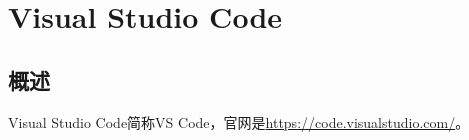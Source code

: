 \documentclass{../main.tex}{subfiles}
\begin{document}
\chapter{Visual Studio Code}
\section{概述}
Visual Studio Code简称VS Code，官网是\url{https://code.visualstudio.com/}。

\end{document}
